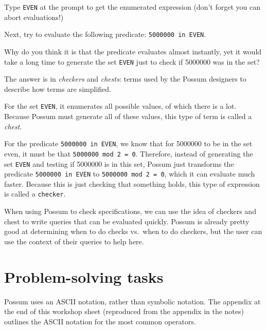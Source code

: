 \documentclass{article}
\begin{document}
\begin{enumerate}
  Type \texttt{EVEN} at the prompt to get the enumerated expression (don't forget you can abort evaluations!)

  Next, try to evaluate the following predicate: \texttt{5000000 in EVEN}.

  Why do you think it is that the predicate evaluates almost instantly, yet it would take a long time to generate the set \texttt{EVEN} just to check if 5000000 was in the set?

  The answer is in \emph{checkers} and \emph{chests}: terms used by the Possum designers to describe how terms are simplified.

  For the set \texttt{EVEN}, it enumerates all possible values, of which there is a lot. Because Possum must generate all of these values, this type of term  is called a \emph{chest}. 

 For the predicate \texttt{5000000 in EVEN}, we know that for 5000000 to be in the set even, it must be that \texttt{5000000 mod 2 = 0}. Therefore, instead of generating the set \texttt{EVEN} and testing if 5000000 is in this set, Possum just transforms the predicate \texttt{5000000 in EVEN} to \texttt{5000000 mod 2 = 0}, which it can evaluate much faster. Because this is just checking that something holds, this type of expression is called a \texttt{checker}.

  When using Possum to check specifications, we can use the idea of checkers and chest to write queries that can be evaluated quickly. Possum is already pretty good at determining when to do checks vs.\ when to do checkers, but the user can use the context of their queries to help here.

\end{enumerate}

\section*{Problem-solving tasks}

Possum uses an ASCII notation, rather than symbolic notation. The appendix at the end of this workshop sheet (reproduced from the appendix in the notes) outlines the ASCII notation for the most common operators.
\end{document}
